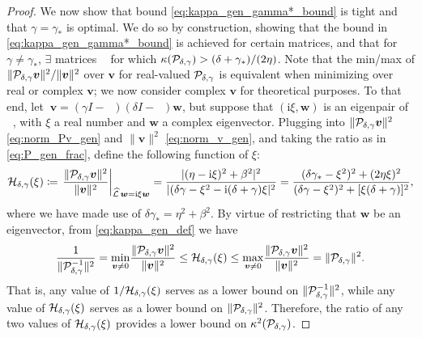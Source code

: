 \documentclass[review]{siamart}
\DeclareMathOperator{\cL}{\widehat{\mathcal{L}}}
\begin{document}
\begin{proof}
We now show that bound \eqref{eq:kappa_gen_gamma*_bound} is tight and that
$\gamma = \gamma_*$ is optimal. We do so by construction, showing that the
bound in \eqref{eq:kappa_gen_gamma*_bound} is achieved for certain matrices, and 
that for $\gamma\neq\gamma_*$, $\exists$ matrices $\cL$ for which
$\kappa({\cal P}_{\delta, \gamma}) > (\delta + \gamma_*)/(2\eta)$. Note that the min/max 
of $\Vert {\cal P}_{\delta,\gamma} \bm{v} \Vert^2/\Vert \bm{v} \Vert^2$ over $\bm{v}$
for real-valued ${\cal P}_{\delta,\gamma}$ is equivalent when minimizing over real
or complex $\bm{v}$; we now consider complex $\bm{v}$ for theoretical
purposes. To that end, let $~\bm{v}=(\gamma I - \cL)(\delta I - \cL) \bm{w}$, but 
suppose that $(\textrm{i} \xi, \bm{w})$ is an eigenpair of $\cL$, with $\xi$
a real number and $\bm{w}$ a complex eigenvector. Plugging into
$\| {\cal P}_{\delta,\gamma} \bm{v}\|^2$ \eqref{eq:norm_Pv_gen} and $\|\bm{v}\|^2$
\eqref{eq:norm_v_gen}, and taking the ratio as in \eqref{eq:P_gen_frac},
define the following function of $\xi$:
%
\begin{align} \label{eq:H_gen_def}
{\cal H}_{\delta,\gamma}(\xi) 
\coloneqq 
\left. \frac{\Vert {\cal P}_{\delta, \gamma} \bm{v} \Vert^2 }{\Vert \bm{v} \Vert^2} \right|_{\cL \bm{w} = \mathrm{i} \xi \bm{w}}
=
\frac{|(\eta- \mathrm{i} \xi)^2 + \beta^2|^2}{|(\delta \gamma - \xi^2 - \mathrm{i} (\delta + \gamma) \xi|^2}
=
\frac{(\delta \gamma_* - \xi^2)^2 + (2 \eta \xi)^2}{(\delta \gamma-\xi^2)^2 + [\xi ( \delta + \gamma) ]^2},
\end{align}
where we have made use of $\delta \gamma_* = \eta^2 + \beta^2$.
By virtue of restricting that $\bm{w}$ be an eigenvector, from \eqref{eq:kappa_gen_def} we have
\begin{align}
\label{eq:H_gen_bounds}
\frac{1}{\Vert {\cal P}_{\delta,\gamma}^{-1} \Vert^2}
=
\underset{\bm{v} \neq 0}{\min} \frac{\Vert {\cal P}_{\delta,\gamma} \bm{v} \Vert^2}{\Vert \bm{v} \Vert^2}
\leq {\cal H}_{\delta,\gamma}(\xi) \leq 
\underset{\bm{v} \neq 0}{\max} \frac{\Vert {\cal P}_{\delta,\gamma} \bm{v} \Vert^2}{\Vert \bm{v} \Vert^2} = \Vert {\cal P}_{\delta,\gamma} \Vert^2.
\end{align}
%
That is, any value of $1/{\cal H}_{\delta,\gamma}(\xi)$ serves as a lower bound on
$\Vert {\cal P}_{\delta,\gamma}^{-1} \Vert^2$, while any value of ${\cal
H}_{\delta,\gamma}(\xi)$ serves as a lower bound on $\Vert {\cal P}_{\delta,\gamma} \Vert^2$.
Therefore, the ratio of any two values of ${\cal H}_{\delta,\gamma}(\xi)$ provides a
lower bound on $\kappa^2({\cal P}_{\delta,\gamma})$.


\end{proof}
\end{document}
